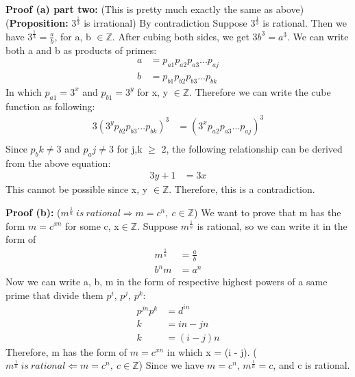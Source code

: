 \documentclass[12pt,letterpaper]{hmcpset}
\begin{document}
\begin{solution}
\textbf{Proof (a) part two:} (This is pretty much exactly the same as above)
\newline(\textbf{Proposition:} $3^{\frac{1}{3}}$ is irrational) By contradiction
\newline Suppose $3^{\frac{1}{3}}$ is rational. Then we have $3^{\frac{1}{3}}=\frac{a}{b}$, for a, b $\in \mathbb{Z}$. After cubing both sides, we get $3b^{3}=a^{3}$. We can write both a and b as products of primes:
\begin{align*}
a	&= p_{a1}p_{a2}p_{a3}...p_{aj}	\\
b	&= p_{b1}p_{b2}p_{b3}...p_{bk}
\end{align*}
In which $p_{a1}=3^{x}$ and $p_{b1}=3^{y}$ for x, y $\in \mathbb{Z}$. Therefore we can write the cube function as following:
\begin{align*}
3(3^{y}p_{b2}p_{b3}...p_{bk})^{3}	&= (3^{x}p_{a2}p_{a3}...p_{aj})^{3}	\\
\end{align*}
Since $p_bk \neq 3$ and $p_aj \neq 3$ for j,k $\ge$ 2, the following relationship can be derived from the above equation:
\begin{align*}
3y + 1	&=	3x
\end{align*}
This cannot be possible since x, y $\in\mathbb{Z}$. Therefore, this is a contradiction.
\end{solution}

\begin{solution}
\textbf{Proof (b):}
\newline ($m^{\frac{1}{n}}\ is\ rational \Rightarrow m=c^{n},\ c\in\mathbb{Z}$)
\newline We want to prove that m has the form $m=c^{xn}$ for some c, x$\in\mathbb{Z}$.
\newline Suppose $m^\frac{1}{n}$ is rational, so we can write it in the form of 
\begin{align*}
m^{\frac{1}{n}}	&= \frac{a}{b}	\\
b^{n}m			&= a^{n}
\end{align*}
Now we can write a, b, m in the form of respective highest powers of a same prime that divide them $p^{i}$, $p^{j}$, $p^{k}$:
\begin{align*}
p^{jn}p^{k}	&=d^{in}	\\
k			&= in - jn	\\
k	&= (i-j)n
\end{align*}
Therefore, m has the form of $m=c^{xn}$ in which x = (i - j).
\newline
\newline ($m^{\frac{1}{n}}\ is\ rational \Leftarrow m=c^{n},\ c\in\mathbb{Z}$)
\newline Since we have $m=c^{n}$, $m^{\frac{1}{n}}=c$, and c is rational.
\end{solution}
\end{document}
